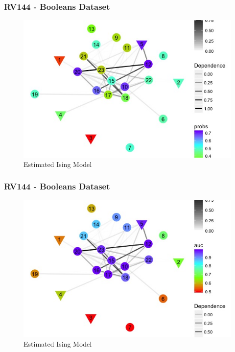 \documentclass{beamer}
\theoremstyle{definition}
\begin{document}

\begin{frame}
\frametitle{RV144 - Booleans Dataset}
\begin{figure}[]
\includegraphics[width=10 cm]{figures/boolNetworkProbs} \caption{Estimated Ising Model}
\end{figure}
\end{frame}


\begin{frame}
\frametitle{RV144 - Booleans Dataset}
\begin{figure}[]
\includegraphics[width=10 cm]{figures/boolNetworkAUC} \caption{Estimated Ising Model}
\end{figure}
\end{frame}

\end{document}
